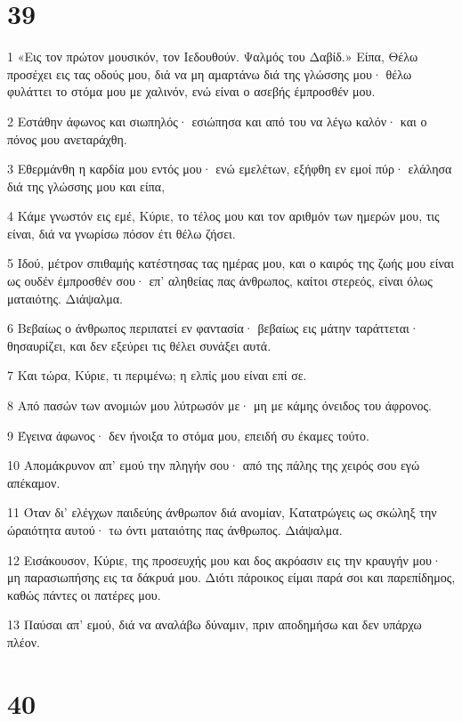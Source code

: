 \chapter{39}

\par 1 «Εις τον πρώτον μουσικόν, τον Ιεδουθούν. Ψαλμός του Δαβίδ.» Είπα, Θέλω προσέχει εις τας οδούς μου, διά να μη αμαρτάνω διά της γλώσσης μου· θέλω φυλάττει το στόμα μου με χαλινόν, ενώ είναι ο ασεβής έμπροσθέν μου.
\par 2 Εστάθην άφωνος και σιωπηλός· εσιώπησα και από του να λέγω καλόν· και ο πόνος μου ανεταράχθη.
\par 3 Εθερμάνθη η καρδία μου εντός μου· ενώ εμελέτων, εξήφθη εν εμοί πύρ· ελάλησα διά της γλώσσης μου και είπα,
\par 4 Κάμε γνωστόν εις εμέ, Κύριε, το τέλος μου και τον αριθμόν των ημερών μου, τις είναι, διά να γνωρίσω πόσον έτι θέλω ζήσει.
\par 5 Ιδού, μέτρον σπιθαμής κατέστησας τας ημέρας μου, και ο καιρός της ζωής μου είναι ως ουδέν έμπροσθέν σου· επ' αληθείας πας άνθρωπος, καίτοι στερεός, είναι όλως ματαιότης. Διάψαλμα.
\par 6 Βεβαίως ο άνθρωπος περιπατεί εν φαντασία· βεβαίως εις μάτην ταράττεται· θησαυρίζει, και δεν εξεύρει τις θέλει συνάξει αυτά.
\par 7 Και τώρα, Κύριε, τι περιμένω; η ελπίς μου είναι επί σε.
\par 8 Από πασών των ανομιών μου λύτρωσόν με· μη με κάμης όνειδος του άφρονος.
\par 9 Έγεινα άφωνος· δεν ήνοιξα το στόμα μου, επειδή συ έκαμες τούτο.
\par 10 Απομάκρυνον απ' εμού την πληγήν σου· από της πάλης της χειρός σου εγώ απέκαμον.
\par 11 Όταν δι' ελέγχων παιδεύης άνθρωπον διά ανομίαν, Κατατρώγεις ως σκώληξ την ώραιότητα αυτού· τω όντι ματαιότης πας άνθρωπος. Διάψαλμα.
\par 12 Εισάκουσον, Κύριε, της προσευχής μου και δος ακρόασιν εις την κραυγήν μου· μη παρασιωπήσης εις τα δάκρυά μου. Διότι πάροικος είμαι παρά σοι και παρεπίδημος, καθώς πάντες οι πατέρες μου.
\par 13 Παύσαι απ' εμού, διά να αναλάβω δύναμιν, πριν αποδημήσω και δεν υπάρχω πλέον.

\chapter{40}

